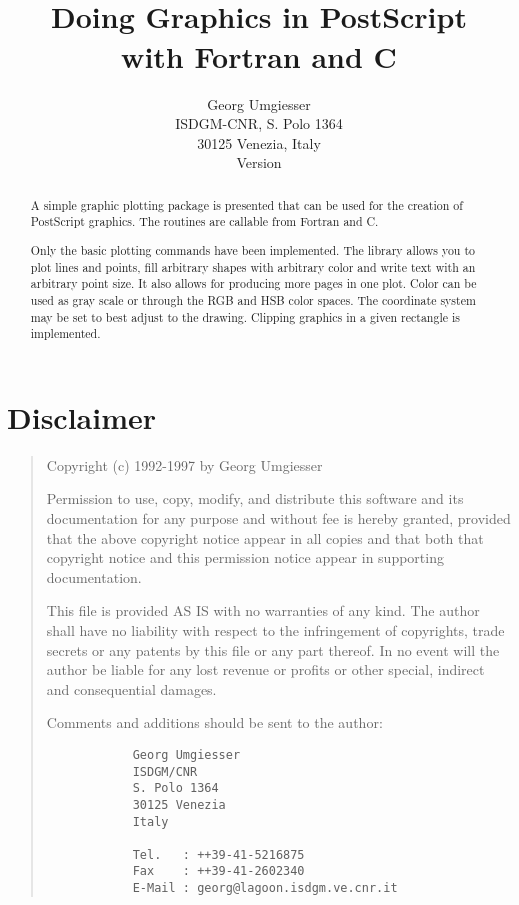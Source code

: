 \documentclass{article}
\title{%
	\psp
	\\Doing Graphics in PostScript
	\\with Fortran and C
	}
\author{%
	Georg Umgiesser
	\\ISDGM-CNR, S. Polo 1364
	\\30125 Venezia, Italy
	\vspace{1cm}
	\\Version \VERSION
	}
\begin{document}
\pagestyle{plain}

\maketitle

\begin{abstract}
A simple graphic plotting package is presented that can be used for
the creation of PostScript graphics. The routines are callable from
Fortran and C.

Only the basic plotting commands have been implemented. The library
allows you to plot lines and points, fill arbitrary shapes
with arbitrary color and write text with an arbitrary point size.
It also allows for producing more pages in one plot. Color can be
used as gray scale or through the RGB and HSB color spaces.
The coordinate system may be set to best adjust to the drawing.
Clipping graphics in a given rectangle is implemented.
\end{abstract}

\thispagestyle{empty}

\newpage

\tableofcontents

\newpage

\section*{Disclaimer}


\begin{quotation}
  									 
   Copyright (c) 1992-1997 by Georg Umgiesser				 
  									 
   Permission to use, copy, modify, and distribute this software	 
   and its documentation for any purpose and without fee is hereby	 
   granted, provided that the above copyright notice appear in all	 
   copies and that both that copyright notice and this permission	 
   notice appear in supporting documentation.				 
  									 
   This file is provided AS IS with no warranties of any kind.		 
   The author shall have no liability with respect to the		 
   infringement of copyrights, trade secrets or any patents by		 
   this file or any part thereof.  In no event will the author		 
   be liable for any lost revenue or profits or other special,		 
   indirect and consequential damages.					 
  									 
   Comments and additions should be sent to the author:			 
  									 
	\begin{verbatim}
  			Georg Umgiesser					 
  			ISDGM/CNR					 
  			S. Polo 1364					 
  			30125 Venezia					 
  			Italy						 
  									 
  			Tel.   : ++39-41-5216875			 
  			Fax    : ++39-41-2602340			 
  			E-Mail : georg@lagoon.isdgm.ve.cnr.it		 
	\end{verbatim}
\end{quotation}
\end{document}
